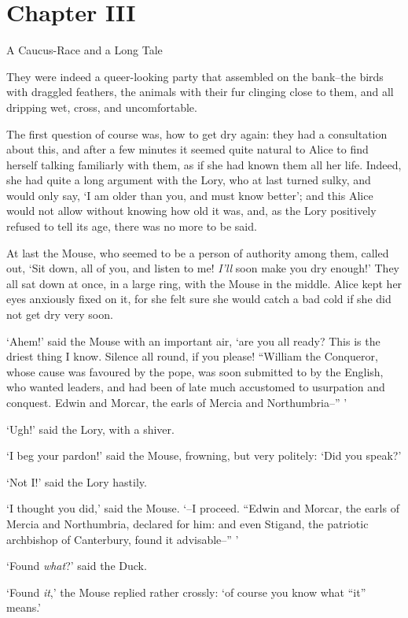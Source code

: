 \chapter{Chapter III}{A Caucus-Race and a Long Tale}


  They were indeed a queer-looking party that assembled on the
bank--the birds with draggled feathers, the animals with their
fur clinging close to them, and all dripping wet, cross, and
uncomfortable.

  The first question of course was, how to get dry again:  they
had a consultation about this, and after a few minutes it seemed
quite natural to Alice to find herself talking familiarly with
them, as if she had known them all her life.  Indeed, she had
quite a long argument with the Lory, who at last turned sulky,
and would only say, `I am older than you, and must know better';
and this Alice would not allow without knowing how old it was,
and, as the Lory positively refused to tell its age, there was no
more to be said.

  At last the Mouse, who seemed to be a person of authority among
them, called out, `Sit down, all of you, and listen to me!  {\it I'll}
soon make you dry enough!'  They all sat down at once, in a large
ring, with the Mouse in the middle.  Alice kept her eyes
anxiously fixed on it, for she felt sure she would catch a bad
cold if she did not get dry very soon.

  `Ahem!' said the Mouse with an important air, `are you all ready?
This is the driest thing I know.  Silence all round, if you please!
``William the Conqueror, whose cause was favoured by the pope, was
soon submitted to by the English, who wanted leaders, and had been
of late much accustomed to usurpation and conquest.  Edwin and
Morcar, the earls of Mercia and Northumbria--'' '

  `Ugh!' said the Lory, with a shiver.

  `I beg your pardon!' said the Mouse, frowning, but very
politely:  `Did you speak?'

  `Not I!' said the Lory hastily.

  `I thought you did,' said the Mouse.  `--I proceed.  ``Edwin and
Morcar, the earls of Mercia and Northumbria, declared for him:
and even Stigand, the patriotic archbishop of Canterbury, found
it advisable--'' '

  `Found {\it what}?' said the Duck.

  `Found {\it it},' the Mouse replied rather crossly:  `of course you
know what ``it'' means.'

